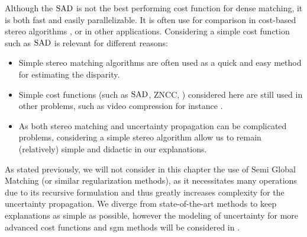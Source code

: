 \begin{remark}
    Although the $\mathrm{SAD}$ is not the best performing cost function for dense matching, it is both fast and easily parallelizable. It is often use for comparison in cost-based stereo algorithms \cite{hirschmuller_evaluation_2007, zbontar_stereo_2016}, or in other applications. Considering a simple cost function such as $\mathrm{SAD}$ is relevant for different reasons:
    \begin{itemize}
        \item Simple stereo matching algorithms are often used as a quick and easy method for estimating the disparity.
        \item Simple cost functions (such as $\mathrm{SAD}$, ZNCC, \etc) considered here are still used in other problems, such as video compression for instance \cite{richardson_h264_2006}.
        \item As both stereo matching and uncertainty propagation can be complicated problems, considering a simple stereo algorithm allow us to remain (relatively) simple and didactic in our explanations. 
    \end{itemize}
\end{remark}

As stated previously, we will not consider in this chapter the use of Semi Global Matching (or similar regularization methods), as it necessitates many operations due to its recursive formulation and thus greatly increases complexity for the uncertainty propagation. We diverge from state-of-the-art methods to keep explanations as simple as possible, however the modeling of uncertainty for more advanced cost functions and \acrshort{sgm} methods will be considered in .

